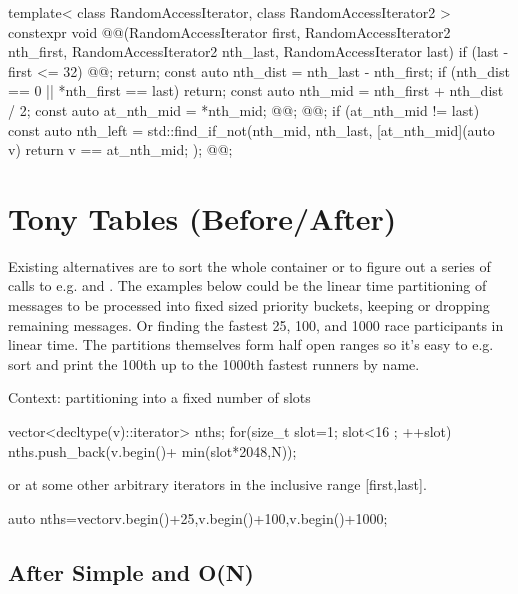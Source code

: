 \begin{codeblock}
template< class RandomAccessIterator, class RandomAccessIterator2 >
constexpr void @@(RandomAccessIterator first, 
  RandomAccessIterator2 nth_first, RandomAccessIterator2 nth_last, 
  RandomAccessIterator last)
{
  if (last - first <= 32) { @@; return; }
  const auto nth_dist = nth_last - nth_first;
  if (nth_dist == 0 || *nth_first == last) return;
  const auto nth_mid = nth_first + nth_dist / 2;
  const auto at_nth_mid = *nth_mid;
  @@;
  @@;
  if (at_nth_mid != last){
    const auto nth_left = std::find_if_not(nth_mid, nth_last, 
      [at_nth_mid](auto v) {return v == at_nth_mid; });
    @@;
  }
}

\end{codeblock}

\section{Tony Tables (Before/After)}

Existing alternatives are to sort the whole container or to figure out a series of calls to e.g.  and . 
The examples below could be the linear time partitioning of messages to be
processed into fixed sized priority buckets, keeping or dropping remaining messages. Or finding the fastest 25, 100, and 1000 race participants in linear time. 
The partitions themselves form half open ranges so it's easy to e.g. sort and
print the 100th up to the 1000th fastest runners by name. 

Context: partitioning into a fixed number of slots
\begin{codeblock}
vector<decltype(v)::iterator> nths;
for(size_t slot=1; slot<16 ; ++slot){
	nths.push_back(v.begin()+ min(slot*2048,N));
}
\end{codeblock}
or at some other arbitrary iterators in the inclusive range [first,last].
\begin{codeblock}
auto nths=vector{v.begin()+25,v.begin()+100,v.begin()+1000}; 
\end{codeblock}

\subsection*{After \textnormal{ Simple and O(N)}}

